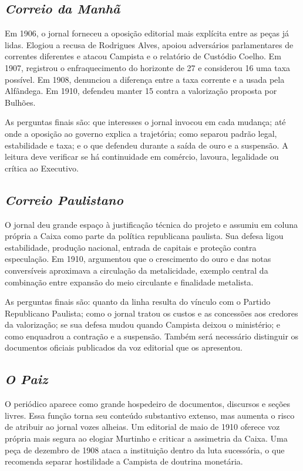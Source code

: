 \subsection{\textit{Correio da Manhã}}

Em 1906, o jornal forneceu a oposição editorial mais explícita entre as peças já lidas. Elogiou a recusa de Rodrigues Alves, apoiou adversários parlamentares de correntes diferentes e atacou Campista e o relatório de Custódio Coelho. Em 1907, registrou o enfraquecimento do horizonte de 27 e considerou 16 uma taxa possível. Em 1908, denunciou a diferença entre a taxa corrente e a usada pela Alfândega. Em 1910, defendeu manter 15 contra a valorização proposta por Bulhões.

As perguntas finais são: que interesses o jornal invocou em cada mudança; até onde a oposição ao governo explica a trajetória; como separou padrão legal, estabilidade e taxa; e o que defendeu durante a saída de ouro e a suspensão. A leitura deve verificar se há continuidade em comércio, lavoura, legalidade ou crítica ao Executivo.

\subsection{\textit{Correio Paulistano}}

O jornal deu grande espaço à justificação técnica do projeto e assumiu em coluna própria a Caixa como parte da política republicana paulista. Sua defesa ligou estabilidade, produção nacional, entrada de capitais e proteção contra especulação. Em 1910, argumentou que o crescimento do ouro e das notas conversíveis aproximava a circulação da metalicidade, exemplo central da combinação entre expansão do meio circulante e finalidade metalista.

As perguntas finais são: quanto da linha resulta do vínculo com o Partido Republicano Paulista; como o jornal tratou os custos e as concessões aos credores da valorização; se sua defesa mudou quando Campista deixou o ministério; e como enquadrou a contração e a suspensão. Também será necessário distinguir os documentos oficiais publicados da voz editorial que os apresentou.

\subsection{\textit{O Paiz}}

O periódico aparece como grande hospedeiro de documentos, discursos e seções livres. Essa função torna seu conteúdo substantivo extenso, mas aumenta o risco de atribuir ao jornal vozes alheias. Um editorial de maio de 1910 oferece voz própria mais segura ao elogiar Murtinho e criticar a assimetria da Caixa. Uma peça de dezembro de 1908 ataca a instituição dentro da luta sucessória, o que recomenda separar hostilidade a Campista de doutrina monetária.

